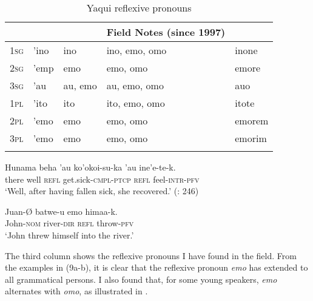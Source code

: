 \documentclass[output=paper]{langscibook}
\begin{document}
\begin{table}
\begin{tabularx}
{0.9\textwidth}{p{1cm}p{3cm}p{1.5cm}p{2.5cm}p{1.3cm}}
\lsptoprule
& \citet{DedrickCasad1999} & \citet{Estrada2009} & {Field Notes} (since 1997) & \citet{Buelna1890} \\
\hline
\textsc{1}\textsc{sg} & {’ino} & {ino} & {ino, emo, omo} & {inone}\\
\textsc{2}\textsc{sg} & {’emp} & {emo} & {emo, omo} & {emore}\\
\textsc{3}\textsc{sg} & {’au} & {au, emo} & {au, emo, omo} & {auo}\\
\textsc{1}\textsc{pl} & {’ito} & {ito} & {ito, emo, omo} & {itote}\\
\textsc{2}\textsc{pl} & {’emo} & {emo} & {emo, omo} & {emorem}\\
\textsc{3}\textsc{pl} & {’emo} & {emo} & {emo, omo} & {emorim}\\
\lspbottomrule
\end{tabularx}
\caption{Yaqui reflexive pronouns}
\label{tab:guerrero:2}
\end{table}


\ea%
    \label{ex:guerrero:8}

\ea
\label{ex:guerrero:8a}
\gll Hunama   beha   ’au  ko’okoi-su-ka   ’au   ine’e-te-k.\\
  there   well  \textsc{refl}  get.sick-\textsc{cmpl-ptcp}   \textsc{refl}   feel-\textsc{intr-pfv}\\
\glt ‘Well, after having fallen sick, she recovered.’ (\citealt{DedrickCasad1999}: 246)

\ex
\label{ex:guerrero:8b}
\gll Juan-Ø  batwe-u  emo  himaa-k.\\
  John-\textsc{nom}  river-\textsc{dir}  \textsc{refl}  throw-\textsc{pfv}\\
\glt ‘John threw himself into the river.’ \citep[129]{Estrada2009}
\z
\z



The third column shows the reflexive pronouns I have found in the field. From the examples in (9a-b), it is clear that the reflexive pronoun \textit{emo} has extended to all grammatical persons. I also found that, for some young speakers, \textit{emo} alternates with \textit{omo}, as illustrated in .



\ea%
    \label{ex:guerrero:9}
\end{document}
